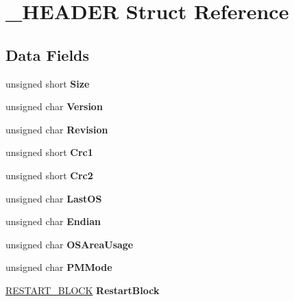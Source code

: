 \hypertarget{struct__HEADER}{}\section{\+\_\+\+H\+E\+A\+D\+ER Struct Reference}
\label{struct__HEADER}
\subsection*{Data Fields}
\begin{DoxyCompactItemize}
\item 
\mbox{\label{struct__HEADER_a397c6cf4dcdfd50bee87012855f94362}} 
unsigned short {\bfseries Size}
\item 
\mbox{\label{struct__HEADER_a76a25d1af908b4343374c4db0f74e527}} 
unsigned char {\bfseries Version}
\item 
\mbox{\label{struct__HEADER_abfbe899284d90d3aec418f252527108e}} 
unsigned char {\bfseries Revision}
\item 
\mbox{\label{struct__HEADER_a68b58a54fe32f0684829448e92c46049}} 
unsigned short {\bfseries Crc1}
\item 
\mbox{\label{struct__HEADER_adaa2c08f653c3dfc1be20e68a779f452}} 
unsigned short {\bfseries Crc2}
\item 
\mbox{\label{struct__HEADER_ae522a563104346cb66aad2db6497f9cf}} 
unsigned char {\bfseries Last\+OS}
\item 
\mbox{\label{struct__HEADER_adfce2cce4c0f51bdf227683a4fa57d50}} 
unsigned char {\bfseries Endian}
\item 
\mbox{\label{struct__HEADER_ab4c39b8d43b250537dafb0603843b22d}} 
unsigned char {\bfseries O\+S\+Area\+Usage}
\item 
\mbox{\label{struct__HEADER_a0b1320cf974bf7d5bc19264d67968d15}} 
unsigned char {\bfseries P\+M\+Mode}
\item 
\mbox{\label{struct__HEADER_a308d7af29456df1169d3c5764e8fb662}} 
\mbox{\hyperlink{struct__RESTART__BLOCK}{R\+E\+S\+T\+A\+R\+T\+\_\+\+B\+L\+O\+CK}} {\bfseries Restart\+Block}

\end{DoxyCompactItemize}

